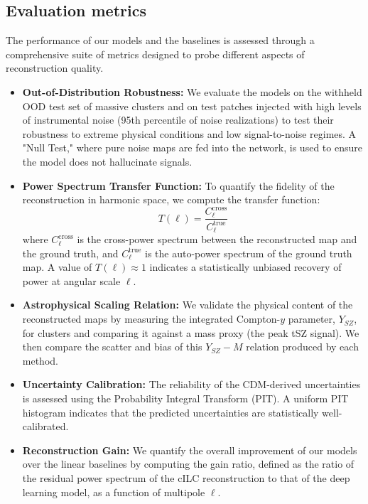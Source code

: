 \documentclass[]{article}
\begin{document}
\subsection{Evaluation metrics}
The performance of our models and the baselines is assessed through a comprehensive suite of metrics designed to probe different aspects of reconstruction quality.
\begin{itemize}
    \item \textbf{Out-of-Distribution Robustness:} We evaluate the models on the withheld OOD test set of massive clusters and on test patches injected with high levels of instrumental noise (95th percentile of noise realizations) to test their robustness to extreme physical conditions and low signal-to-noise regimes. A "Null Test," where pure noise maps are fed into the network, is used to ensure the model does not hallucinate signals.
    \item \textbf{Power Spectrum Transfer Function:} To quantify the fidelity of the reconstruction in harmonic space, we compute the transfer function:
    \begin{equation}
        T(\ell) = \frac{C_{\ell}^{\text{cross}}}{C_{\ell}^{\text{true}}}
    \end{equation}
    where $C_{\ell}^{\text{cross}}$ is the cross-power spectrum between the reconstructed map and the ground truth, and $C_{\ell}^{\text{true}}$ is the auto-power spectrum of the ground truth map. A value of $T(\ell) \approx 1$ indicates a statistically unbiased recovery of power at angular scale $\ell$.
    \item \textbf{Astrophysical Scaling Relation:} We validate the physical content of the reconstructed maps by measuring the integrated Compton-$y$ parameter, $Y_{SZ}$, for clusters and comparing it against a mass proxy (the peak tSZ signal). We then compare the scatter and bias of this $Y_{SZ}-M$ relation produced by each method.
    \item \textbf{Uncertainty Calibration:} The reliability of the CDM-derived uncertainties is assessed using the Probability Integral Transform (PIT). A uniform PIT histogram indicates that the predicted uncertainties are statistically well-calibrated.
    \item \textbf{Reconstruction Gain:} We quantify the overall improvement of our models over the linear baselines by computing the gain ratio, defined as the ratio of the residual power spectrum of the cILC reconstruction to that of the deep learning model, as a function of multipole $\ell$.
\end{itemize}
\end{document}
